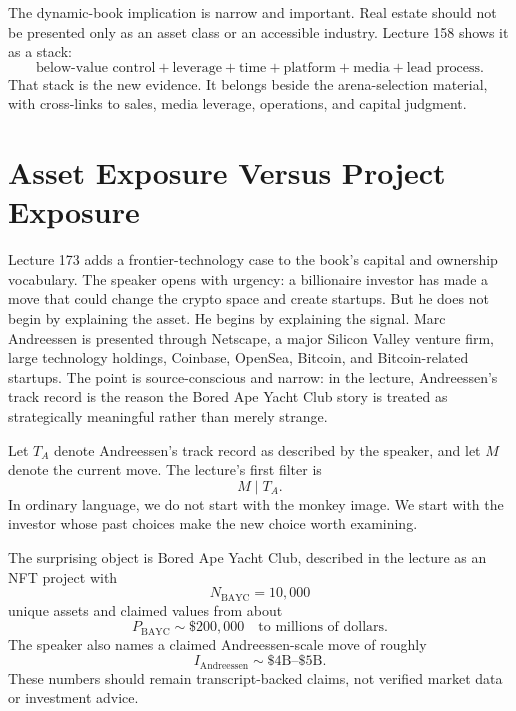\documentclass[11pt,oneside]{book}
\begin{document}
The dynamic-book implication is narrow and important. Real estate should not be presented only as an asset class or an accessible industry. Lecture 158 shows it as a stack:
\[
\text{below-value control}
+
\text{leverage}
+
\text{time}
+
\text{platform}
+
\text{media}
+
\text{lead process}.
\]
That stack is the new evidence. It belongs beside the arena-selection material, with cross-links to sales, media leverage, operations, and capital judgment.


\section{Asset Exposure Versus Project Exposure}

Lecture 173 adds a frontier-technology case to the book's capital and ownership vocabulary. The speaker opens with urgency: a billionaire investor has made a move that could change the crypto space and create startups. But he does not begin by explaining the asset. He begins by explaining the signal. Marc Andreessen is presented through Netscape, a major Silicon Valley venture firm, large technology holdings, Coinbase, OpenSea, Bitcoin, and Bitcoin-related startups. The point is source-conscious and narrow: in the lecture, Andreessen's track record is the reason the Bored Ape Yacht Club story is treated as strategically meaningful rather than merely strange.

Let \(T_A\) denote Andreessen's track record as described by the speaker, and let \(M\) denote the current move. The lecture's first filter is
\[
M \mid T_A.
\]
In ordinary language, we do not start with the monkey image. We start with the investor whose past choices make the new choice worth examining.

The surprising object is Bored Ape Yacht Club, described in the lecture as an NFT project with
\[
N_{\mathrm{BAYC}}=10{,}000
\]
unique assets and claimed values from about
\[
P_{\mathrm{BAYC}}\sim \$200{,}000
\quad \text{to millions of dollars}.
\]
The speaker also names a claimed Andreessen-scale move of roughly
\[
I_{\mathrm{Andreessen}}\sim \$4\mathrm{B}\text{--}\$5\mathrm{B}.
\]
These numbers should remain transcript-backed claims, not verified market data or investment advice.
\end{document}
